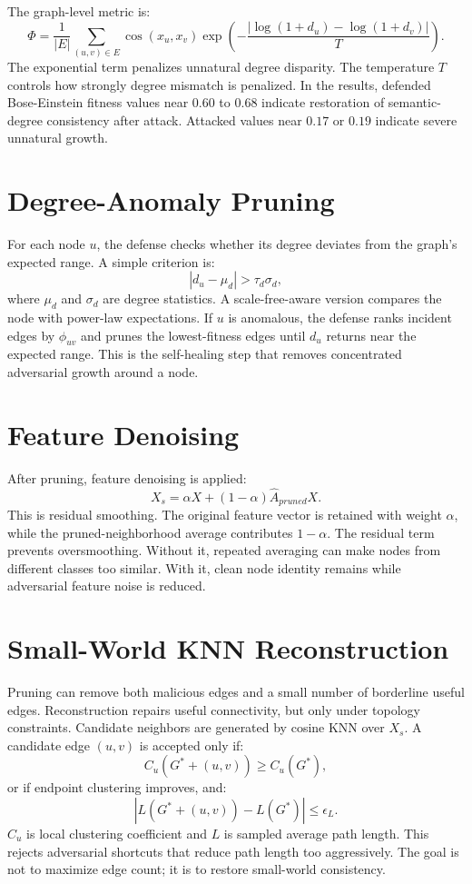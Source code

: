 \documentclass[12pt,oneside]{report}
\begin{document}
The graph-level metric is:
$$
\Phi=\frac{1}{|E|}\sum_{(u,v)\in E}
\cos(x_u,x_v)\exp\left(-\frac{|\log(1+d_u)-\log(1+d_v)|}{T}\right).
$$
The exponential term penalizes unnatural degree disparity. The temperature $T$ controls how strongly degree mismatch is penalized. In the results, defended Bose-Einstein fitness values near $0.60$ to $0.68$ indicate restoration of semantic-degree consistency after attack. Attacked values near $0.17$ or $0.19$ indicate severe unnatural growth.

\section{Degree-Anomaly Pruning}
For each node $u$, the defense checks whether its degree deviates from the graph's expected range. A simple criterion is:
$$
|d_u-\mu_d|>\tau_d\sigma_d,
$$
where $\mu_d$ and $\sigma_d$ are degree statistics. A scale-free-aware version compares the node with power-law expectations. If $u$ is anomalous, the defense ranks incident edges by $\phi_{uv}$ and prunes the lowest-fitness edges until $d_u$ returns near the expected range. This is the self-healing step that removes concentrated adversarial growth around a node.

\section{Feature Denoising}
After pruning, feature denoising is applied:
$$
X_s=\alpha X+(1-\alpha)\hat{A}_{pruned}X.
$$
This is residual smoothing. The original feature vector is retained with weight $\alpha$, while the pruned-neighborhood average contributes $1-\alpha$. The residual term prevents oversmoothing. Without it, repeated averaging can make nodes from different classes too similar. With it, clean node identity remains while adversarial feature noise is reduced.

\section{Small-World KNN Reconstruction}
Pruning can remove both malicious edges and a small number of borderline useful edges. Reconstruction repairs useful connectivity, but only under topology constraints. Candidate neighbors are generated by cosine KNN over $X_s$. A candidate edge $(u,v)$ is accepted only if:
$$
C_u(G^*+(u,v))\geq C_u(G^*),
$$
or if endpoint clustering improves, and:
$$
|L(G^*+(u,v))-L(G^*)|\leq \epsilon_L.
$$
$C_u$ is local clustering coefficient and $L$ is sampled average path length. This rejects adversarial shortcuts that reduce path length too aggressively. The goal is not to maximize edge count; it is to restore small-world consistency.
\end{document}
